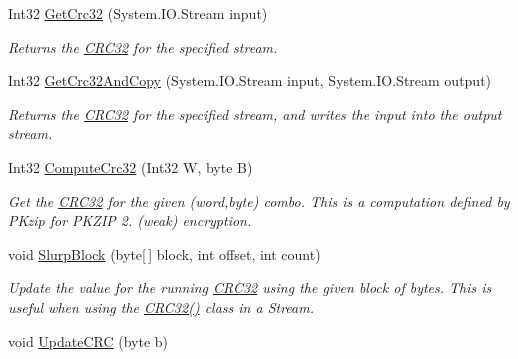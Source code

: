 \begin{DoxyCompactItemize}
\item 
Int32 \mbox{\hyperlink{class_super_tiled2_unity_1_1_ionic_1_1_crc_1_1_c_r_c32_a15be255989390633f0344f817b124911}{Get\+Crc32}} (System.\+I\+O.\+Stream input)
\begin{DoxyCompactList}\small\item\em Returns the \mbox{\hyperlink{class_super_tiled2_unity_1_1_ionic_1_1_crc_1_1_c_r_c32}{C\+R\+C32}} for the specified stream. \end{DoxyCompactList}\item 
Int32 \mbox{\hyperlink{class_super_tiled2_unity_1_1_ionic_1_1_crc_1_1_c_r_c32_a463a42082c0ed59d8e1c20e60c4e6d8d}{Get\+Crc32\+And\+Copy}} (System.\+I\+O.\+Stream input, System.\+I\+O.\+Stream output)
\begin{DoxyCompactList}\small\item\em Returns the \mbox{\hyperlink{class_super_tiled2_unity_1_1_ionic_1_1_crc_1_1_c_r_c32}{C\+R\+C32}} for the specified stream, and writes the input into the output stream. \end{DoxyCompactList}\item 
Int32 \mbox{\hyperlink{class_super_tiled2_unity_1_1_ionic_1_1_crc_1_1_c_r_c32_abc80dde14bd2132eb4ebcbd88b8f9aaf}{Compute\+Crc32}} (Int32 W, byte B)
\begin{DoxyCompactList}\small\item\em Get the \mbox{\hyperlink{class_super_tiled2_unity_1_1_ionic_1_1_crc_1_1_c_r_c32}{C\+R\+C32}} for the given (word,byte) combo. This is a computation defined by P\+Kzip for P\+K\+Z\+IP 2. (weak) encryption. \end{DoxyCompactList}\item 
void \mbox{\hyperlink{class_super_tiled2_unity_1_1_ionic_1_1_crc_1_1_c_r_c32_ad7cbadf67f7afe7d490460a1f9fc2bd4}{Slurp\+Block}} (byte\mbox{[}$\,$\mbox{]} block, int offset, int count)
\begin{DoxyCompactList}\small\item\em Update the value for the running \mbox{\hyperlink{class_super_tiled2_unity_1_1_ionic_1_1_crc_1_1_c_r_c32}{C\+R\+C32}} using the given block of bytes. This is useful when using the \mbox{\hyperlink{class_super_tiled2_unity_1_1_ionic_1_1_crc_1_1_c_r_c32_aaa06a281b345284e2703ffb94ba46433}{C\+R\+C32()}} class in a Stream. \end{DoxyCompactList}\item 
void \mbox{\hyperlink{class_super_tiled2_unity_1_1_ionic_1_1_crc_1_1_c_r_c32_a078816cf3a9bdd4f29a898bf94cb1bde}{Update\+C\+RC}} (byte b)

\end{DoxyCompactItemize}
